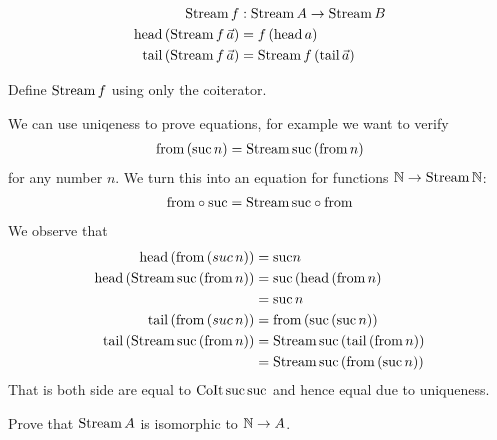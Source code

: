 \begin{align*}
\mathrm{Stream}\,f & : \mathrm{Stream}\,A \to \mathrm{Stream}\,B \\
\mathrm{head}\,(\mathrm{Stream}\,f\,\vec{a}) & = f\,(\mathrm{head}\,a) \\
\mathrm{tail}\,(\mathrm{Stream}\,f\,\vec{a}) & = \mathrm{Stream}\,f\,(\mathrm{tail}\,\vec{a})
\end{align*}
\begin{Exercise}
  Define $\mathrm{Stream}\,f$ using only the coiterator.
\end{Exercise}

We can use uniqeness to prove equations, for example we want to verify
\begin{align*}
\mathrm{from}\,(\mathrm{suc}\,n) = \mathrm{Stream}\,\mathrm{suc}\,(\mathrm{from}\,n)
\end{align*}
for any number $n$. We turn this into an equation for functions $\mathbb{N} \to \mathrm{Stream}\,\mathbb{N}$:
\begin{align*}
  \mathrm{from} \circ \mathrm{suc} = \mathrm{Stream}\,\mathrm{suc} \circ \mathrm{from}
\end{align*}
We observe that 
\begin{align*}
  \mathrm{head}\,(\mathrm{from}\,(suc\,n)) & = \mathrm{suc} n\\
  \mathrm{head}\,(\mathrm{Stream}\,\mathrm{suc}\,(\mathrm{from}\,n)) & = \mathrm{suc}\,(\mathrm{head}\,(\mathrm{from}\,n) \\
  & = \mathrm{suc}\,n\\
  \mathrm{tail}\, (\mathrm{from}\,(suc\,n)) & = \mathrm{from}\,(\mathrm{suc}\,(\mathrm{suc}\,n))\\
  \mathrm{tail}\, (\mathrm{Stream}\,\mathrm{suc}\,(\mathrm{from}\,n)) & = \mathrm{Stream}\,\mathrm{suc}\,(\mathrm{tail}\,(\mathrm{from}\,n))\\
                                        & = \mathrm{Stream}\,\mathrm{suc}\,(\mathrm{from}\,(\mathrm{suc}\,n))
\end{align*}
That is both side are equal to $\mathrm{CoIt}\,\mathrm{suc}\,\mathrm{suc}$ and hence equal due to uniqueness. 

\begin{Exercise}
  Prove that $\mathrm{Stream}\,A$ is isomorphic to $\mathbb{N} \to A$.
\end{Exercise}

